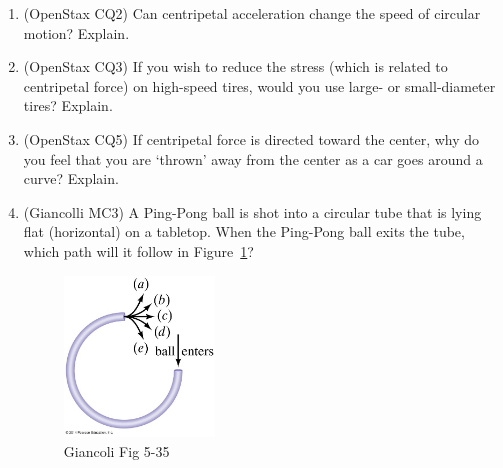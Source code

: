 \documentclass[10pt,twocolumn]{exam}
\def\answer#1{\footnotetext{#1}}
\def\myquestion{\question\stepcounter{footnote}}
\begin{document}
\begin{questions}







\begin{enumerate}[label=CQ\arabic*.]
  \item (OpenStax CQ2) Can centripetal acceleration change the speed of circular motion? Explain.
  \item (OpenStax CQ3) If you wish to reduce the stress (which is related to centripetal force) on high-speed tires, would you use large- or small-diameter tires? Explain.
  \item (OpenStax CQ5) If centripetal force is directed toward the center, why do you feel that you are `thrown' away from the center as a car goes around a curve? Explain.
  \item (Giancolli MC3) A Ping-Pong ball is shot into a circular tube that is lying flat (horizontal) on a tabletop. When the Ping-Pong ball exits the tube, which path will it follow in Figure~\ref{G5-35}?
  \begin{figure}[h]
    \centering
    \includegraphics[width=4cm]{05_35_Figure.jpg}
    \caption{Giancoli Fig 5-35}
    \label{G5-35}
  \end{figure}
\end{enumerate}

\vs 


\end{questions}
\end{document}

